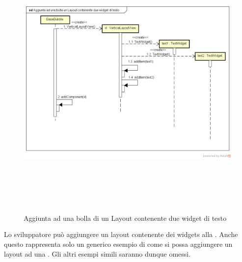 \label{Aggiunta ad una bolla di un Layout contenente due widget di testo}
\begin{figure}[H]
	\centering
	\includegraphics[width=16cm, height=14cm]{Sezioni/Diagrammi/SDK/Aggiunta ad una bolla un Layout contenente due widget di testo.png}
	\caption{Aggiunta ad una bolla di un Layout contenente due widget di testo}
	
\end{figure}
Lo sviluppatore può aggiungere un layout contenente dei widgets alla . Anche questo rappresenta solo un generico esempio di come si possa aggiungere un layout ad una . Gli altri esempi simili saranno dunque omessi. 

\newpage